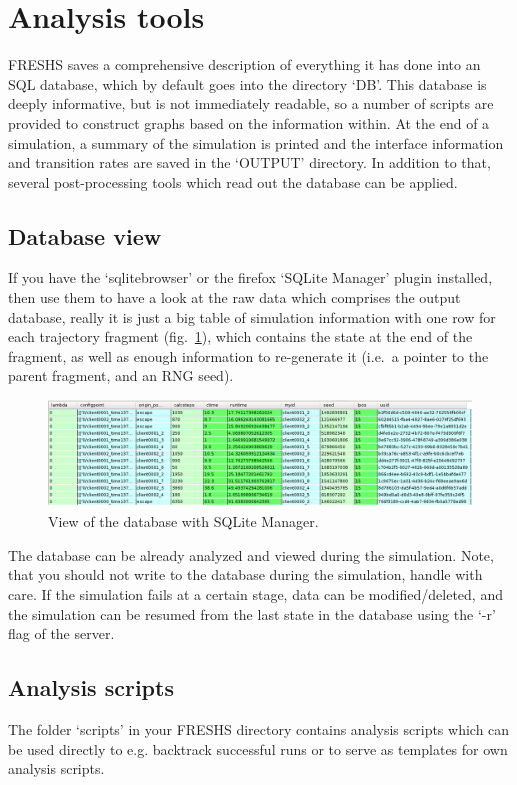 \documentclass[a4paper,oneside]{article}
\begin{document}
\section{Analysis tools}

FRESHS saves a comprehensive description of everything it has done into an SQL database, which by default goes into the directory `DB'.  This database is deeply informative, but is not immediately readable, so a number of scripts are provided to construct graphs based on the information within. At the end of a simulation, a summary of the simulation is printed and the interface information and transition rates are saved in the `OUTPUT' directory. In addition to that, several post-processing tools which read out the database can be applied.

\subsection{Database view}
If you have the `sqlitebrowser' or the firefox `SQLite Manager' plugin installed, then use them to have a look at the raw data which comprises the output database, really it is just a big table of simulation information with one row for each trajectory fragment (fig.~\ref{fig:sqlitemanager}), which contains the state at the end of the fragment, as well as enough information to re-generate it (i.e.~a pointer to the parent fragment, and an RNG seed).
\begin{figure}
 \centering
 \includegraphics[width=0.99\linewidth]{pics/freshs-sqlite-view}
 \caption{View of the database with SQLite Manager.}
 \label{fig:sqlitemanager}
\end{figure}
The database can be already analyzed and viewed during the simulation. Note, that you should not write to the database during the simulation, handle with care. If the simulation fails at a certain stage, data can be modified/deleted, and the simulation can be resumed from the last state in the database using the `-r' flag of the server.

\subsection{Analysis scripts}
The folder `scripts' in your FRESHS directory contains analysis scripts which can be used directly to e.g. backtrack successful runs or to serve as templates for own analysis scripts.
\end{document}
